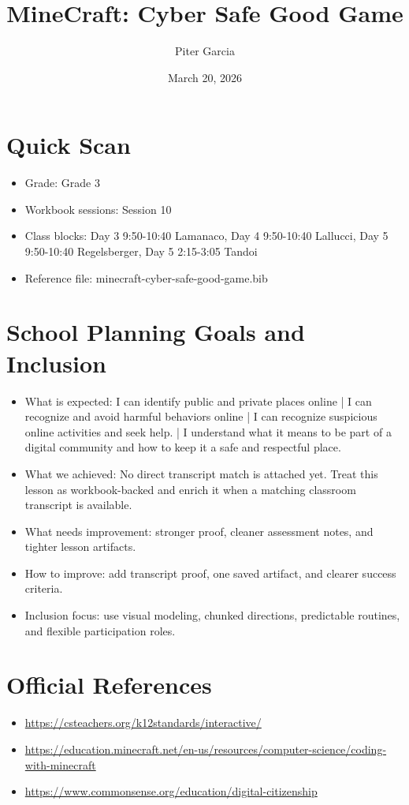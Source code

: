 \documentclass[11pt]{article}
\title{MineCraft: Cyber Safe Good Game}
\author{Piter Garcia}
\date{March 20, 2026}
\begin{document}
    \maketitle
    \section*{Quick Scan}
    \begin{itemize}[leftmargin=*]
    \item Grade: Grade 3
    \item Workbook sessions: Session 10
    \item Class blocks: Day 3 9:50-10:40 Lamanaco, Day 4 9:50-10:40 Lallucci, Day 5 9:50-10:40 Regelsberger, Day 5 2:15-3:05 Tandoi
    \item Reference file: minecraft-cyber-safe-good-game.bib
    \end{itemize}
    \section*{School Planning Goals and Inclusion}
    \begin{itemize}[leftmargin=*]
    \item What is expected: I can identify public and private places online | I can recognize and avoid harmful behaviors online | I can recognize suspicious online activities and seek help. | I understand what it means to be part of a digital community and how to keep it a safe and respectful place.
    \item What we achieved: No direct transcript match is attached yet. Treat this lesson as workbook-backed and enrich it when a matching classroom transcript is available.
    \item What needs improvement: stronger proof, cleaner assessment notes, and tighter lesson artifacts.
    \item How to improve: add transcript proof, one saved artifact, and clearer success criteria.
    \item Inclusion focus: use visual modeling, chunked directions, predictable routines, and flexible participation roles.
    \end{itemize}
    \section*{Official References}
    \begin{itemize}[leftmargin=*]
    \item \url{https://csteachers.org/k12standards/interactive/}
\item \url{https://education.minecraft.net/en-us/resources/computer-science/coding-with-minecraft}
\item \url{https://www.commonsense.org/education/digital-citizenship}

    \end{itemize}
    
\end{document}
